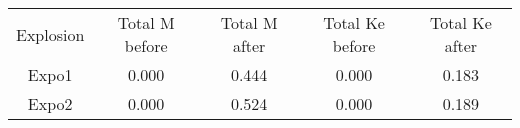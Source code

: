 \begin{table}[]
	\begin{tabular}{@{}ccccc@{}}
		Explosion & Total M before & Total M after & Total Ke before & Total Ke after \\
		Expo1     & 0.000          & 0.444         & 0.000           & 0.183          \\
		Expo2     & 0.000          & 0.524         & 0.000           & 0.189
	\end{tabular}
\end{table}